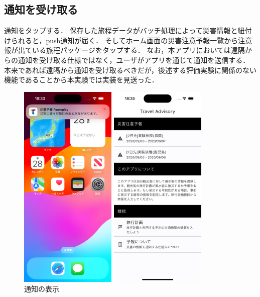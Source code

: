 \subsection {通知を受け取る}
通知をタップする．
保存した旅程データがバッチ処理によって災害情報と紐付けられると，push通知が届く．
そしてホーム画面の災害注意予報一覧から注意報が出ている旅程パッケージをタップする．
なお，本アプリにおいては遠隔からの通知を受け取る仕様ではなく，ユーザがアプリを通じて通知を送信する．
本来であれば遠隔から通知を受け取るべきだが，後述する評価実験に関係のない機能であることから本実験では実装を見送った．

\begin{figure}[H]
  \begin{minipage}[b]{0.45\linewidth}
    \centering
    \includegraphics[height=10cm]{./fig/notion.png}
    \caption{通知の表示}
    \label{fig:notion}
  \end{minipage}
  \begin{minipage}[b]{0.45\linewidth}
    \centering
    \includegraphics[height=10cm]{./fig/unormal_home_screen.png}

\end{minipage}
\end{figure}
